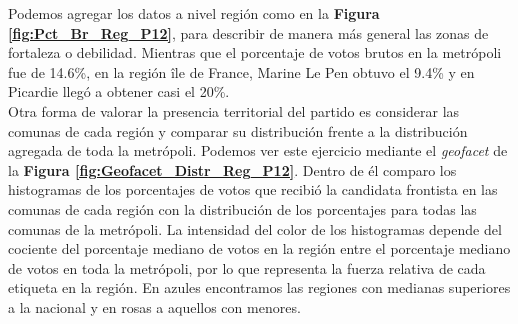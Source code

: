 Podemos agregar los datos a nivel región como en la \textbf{Figura \ref{fig:Pct_Br_Reg_P12}}, para describir de manera más general las zonas de fortaleza o debilidad. Mientras que el porcentaje de votos brutos en la metrópoli fue de 14.6\%, en la región île de France, Marine Le Pen obtuvo el 9.4\% y en Picardie llegó a obtener casi el 20\%.\\

Otra forma de valorar la presencia territorial del partido es considerar las comunas de cada región y comparar su distribución frente a la distribución agregada de toda la metrópoli. Podemos ver este ejercicio mediante el \textit{geofacet} de la \textbf{Figura \ref{fig:Geofacet_Distr_Reg_P12}}. Dentro de él comparo los histogramas de los porcentajes de votos que recibió la candidata frontista en las comunas de cada región con la distribución de los porcentajes para todas las comunas de la metrópoli. La intensidad del color de los histogramas depende del cociente del porcentaje mediano de votos en la región entre el porcentaje mediano de votos en toda la metrópoli, por lo que representa la fuerza relativa de cada etiqueta en la región. En azules encontramos las regiones con medianas superiores a la nacional y en rosas a aquellos con menores.\\


